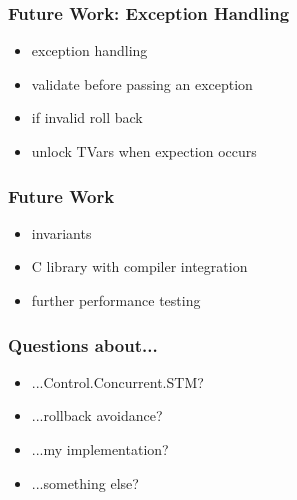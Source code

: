 \documentclass{beamer}
\begin{document}
 \begin{frame}
  \frametitle{Future Work: Exception Handling}
   \begin{itemize}\setlength\itemsep{1em}
    \item exception handling
    \item validate before passing an exception
    \item if invalid roll back
    \item unlock TVars when expection occurs
   \end{itemize}
  \end{frame}
  
\begin{frame}
 \frametitle{Future Work}
 \begin{itemize}\setlength\itemsep{1em}
  \item invariants 
  \item C library with compiler integration
  \item further performance testing
 \end{itemize}
\end{frame}

 

\begin{frame}
 \frametitle{Questions about...}
 \begin{itemize}\setlength\itemsep{1em}
  \item ...Control.Concurrent.STM?
  \item ...rollback avoidance?
  \item ...my implementation?
  \item ...something else?
\end{itemize}
\end{frame}


  
\end{document}
